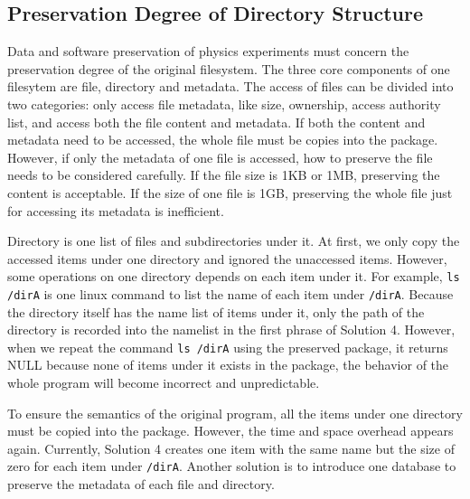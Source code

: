\documentclass{acm_proc_article-sp}
\begin{document}
\subsection{Preservation Degree of Directory Structure}

Data and software preservation of physics experiments must concern the
preservation degree of the original filesystem.  The three core components of
one filesytem are file, directory and metadata.  The access of files can be
divided into two categories: only access file metadata, like size, ownership,
access authority list, and access both the file content and metadata.  If both
the content and metadata need to be accessed, the whole file must be copies
into the package.  However, if only the metadata of one file is accessed, how
to preserve the file needs to be considered carefully. If the file size
is 1KB or 1MB, preserving the content is acceptable. If the size of one file is
1GB, preserving the whole file just for accessing its metadata is
inefficient.  

Directory is one list of files and subdirectories under it. At first, we only
copy the accessed items under one directory and ignored the unaccessed items.
However, some operations on one directory depends on each item under it. For
example, {\tt ls /dirA} is one linux command to list the name of each item under
{\tt /dirA}. Because the directory itself has the name list of items under it, only
the path of the directory is recorded into the namelist in the first phrase of
Solution 4. However, when we repeat the command {\tt ls /dirA} using the preserved package, it returns NULL because none of items under it exists in
the package, the behavior of the whole program will become incorrect
and unpredictable. 

To ensure the semantics of the original program, all the items under one directory must be copied
into the package. However, the
time and space overhead appears again. Currently, Solution 4 creates one item
with the same name but the size of zero for each item under {\tt /dirA}. Another
solution is to introduce one database to preserve the metadata of each file and
directory. 
\end{document}
